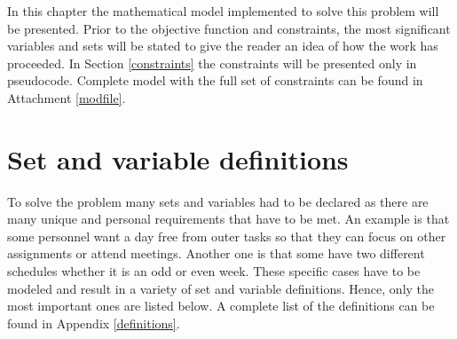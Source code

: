 In this chapter the mathematical model implemented to solve this problem will be presented. Prior to the objective function and constraints, the most significant variables and sets will be stated to give the reader an idea of how the work has proceeded. In Section \ref{constraints} the constraints will be presented only in pseudocode. Complete model with the full set of constraints can be found in Attachment \ref{modfile}. %
\section{Set and variable definitions} \label{variables}
To solve the problem many sets and variables had to be declared as there are many unique and personal requirements that have to be met. An example is that some personnel want a day free from outer tasks so that they can focus on other assignments or attend meetings. Another one is that some have two different schedules whether it is an odd or even week. These specific cases have to be modeled and result in a variety of set and variable definitions. Hence, only the most important ones are listed below. A complete list of the definitions can be found in Appendix \ref{definitions}. \\
 \\
  \\
	 	\\
                                                                \\
                                                       \\
                                                   \\
                                                \\

